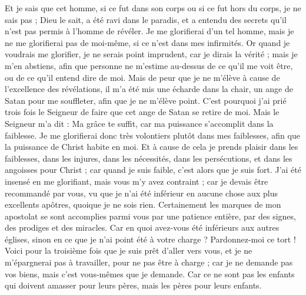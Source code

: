 \begin{multicols}{2}
Et je sais que cet homme, si ce fut dans son corps ou si ce fut hors du corps, je ne sais pas ; Dieu le sait,
a été ravi dans le paradis, et a entendu des secrets qu'il n'est pas permis à l'homme de révéler.
Je me glorifierai d'un tel homme, mais je ne me glorifierai pas de moi-même, si ce n'est dans mes infirmités. 
Or quand je voudrais me glorifier, je ne serais point imprudent, car je dirais la vérité ; mais je m'en abstiens, afin que personne ne m'estime au-dessus de ce qu'il me voit être, ou de ce qu'il entend dire de moi.
Mais de peur que je ne m'élève à cause de l'excellence des révélations, il m'a été mis une écharde dans la chair, un ange de Satan pour me souffleter, afin que je ne m'élève point.
C'est pourquoi j'ai prié trois fois le Seigneur de faire que cet ange de Satan se retire de moi.
Mais le Seigneur m'a dit : Ma grâce te suffit, car ma puissance s'accomplit dans la faiblesse. Je me glorifierai donc très volontiers plutôt dans mes faiblesses, afin que la puissance de Christ habite en moi.
Et à cause de cela je prends plaisir dans les faiblesses, dans les injures, dans les nécessités, dans les persécutions, et dans les angoisses pour Christ ; car quand je suis faible, c'est alors que je suis fort.
J'ai été insensé en me glorifiant, mais vous m'y avez contraint ; car je devais être recommandé par vous, vu que je n'ai été inférieur en aucune chose aux plus excellents apôtres, quoique je ne sois rien.
Certainement les marques de mon apostolat se sont accomplies parmi vous par une patience entière, par des signes, des prodiges et des miracles.
Car en quoi avez-vous été inférieurs aux autres églises, sinon en ce que je n'ai point été à votre charge ? Pardonnez-moi ce tort !
Voici pour la troisième fois que je suis prêt d'aller vers vous, et je ne m'épargnerai pas à travailler, pour ne pas être à charge ; car je ne demande pas vos biens, mais c'est vous-mêmes que je demande. Car ce ne sont pas les enfants qui doivent amasser pour leurs pères, mais les pères pour leurs enfants.

\end{multicols}
